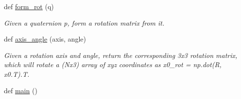 \begin{DoxyCompactItemize}
def \hyperlink{namespacesrc_1_1molecule_a593b80c51a439f35789c16ad5fbcbfec}{form\+\_\+rot} (q)
\begin{DoxyCompactList}\small\item\em Given a quaternion p, form a rotation matrix from it. \end{DoxyCompactList}\item 
def \hyperlink{namespacesrc_1_1molecule_a18b08895867e37ef3cb86a3d4456c775}{axis\+\_\+angle} (axis, angle)
\begin{DoxyCompactList}\small\item\em Given a rotation axis and angle, return the corresponding 3x3 rotation matrix, which will rotate a (Nx3) array of xyz coordinates as x0\+\_\+rot = np.\+dot(R, x0.\+T).T. \end{DoxyCompactList}\item 
def \hyperlink{namespacesrc_1_1molecule_a596a9d60dc2ba03cd91633d0689620d6}{main} ()
\end{DoxyCompactItemize}
